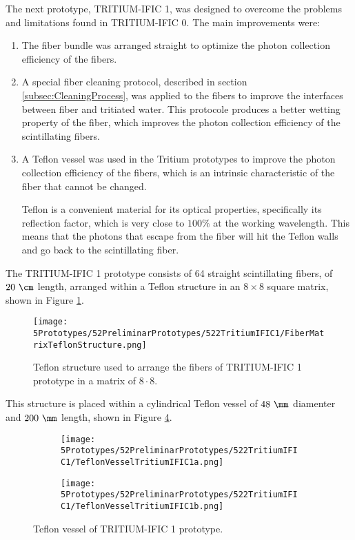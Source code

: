 The next prototype, TRITIUM-IFIC 1, was designed to overcome the problems and limitations found in TRITIUM-IFIC 0. The main improvements were:

\begin{enumerate}

\item{} The fiber bundle was arranged straight to optimize the photon collection efficiency of the fibers.

\item{} A special fiber cleaning protocol, described in section \ref{subsec:CleaningProcess}, was applied to the fibers to improve the interfaces between fiber and tritiated water. This protocole produces a better wetting property of the fiber, which improves the photon collection efficiency of the scintillating fibers.

\item{} A Teflon vessel was used in the Tritium prototypes to improve the photon collection efficiency of the fibers, which is an intrinsic characteristic of the fiber that cannot be changed.

Teflon is a convenient material for its optical properties, specifically its reflection factor, which is very close to $100\%$ at the working wavelength. This means that the photons that escape from the fiber will hit the Teflon walls and go back to the scintillating fiber.

\end{enumerate}

The TRITIUM-IFIC 1 prototype consists of 64 straight scintillating fibers, of $20~\cm$ length, arranged within a Teflon structure in an $8\times 8$ square matrix, shown in Figure \ref{fig:TeflonStructureFibersTritiumIFIC1}.

\begin{figure}[h]
\centering
\texttt{[image: 5Prototypes/52PreliminarPrototypes/522TritiumIFIC1/FiberMatrixTeflonStructure.png]}
\caption{Teflon structure used to arrange the fibers of TRITIUM-IFIC 1 prototype in a matrix of $8\cdot{}8$.\label{fig:TeflonStructureFibersTritiumIFIC1}}
\end{figure}
This structure is placed within a cylindrical Teflon vessel of $48~\mm$ diamenter and $200~\mm$ length, shown in Figure \ref{fig:TeflonVesselTritumIFIC1}. 

\begin{figure}
\centering
    \begin{subfigure}[b]{0.30\textwidth}
    \centering
    \texttt{[image: 5Prototypes/52PreliminarPrototypes/522TritiumIFIC1/TeflonVesselTritiumIFIC1a.png]}  
    \caption{\label{subfig:TeflonVesselTritumIFIC1a}}
    \end{subfigure}
    \hfill
    \begin{subfigure}[b]{0.45\textwidth}
    \centering
    \texttt{[image: 5Prototypes/52PreliminarPrototypes/522TritiumIFIC1/TeflonVesselTritiumIFIC1b.png]}  
    \caption{\label{subfig:TeflonVesselTritumIFIC1b}}
    \end{subfigure}
 \caption{Teflon vessel of TRITIUM-IFIC 1 prototype.}
 \label{fig:TeflonVesselTritumIFIC1}
\end{figure}

